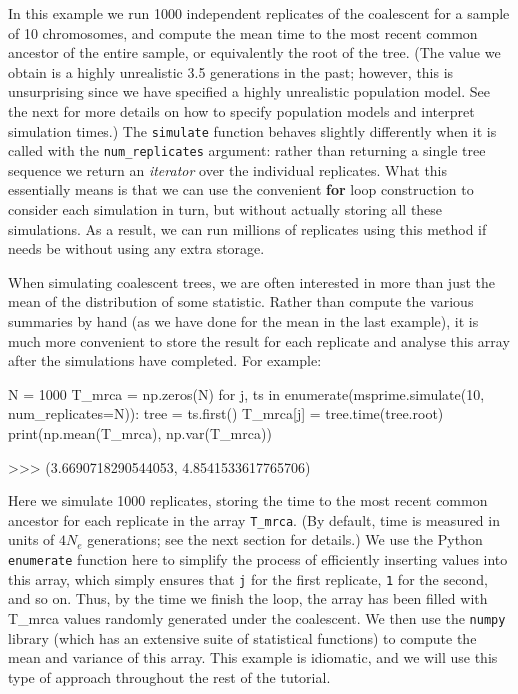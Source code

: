 \documentclass[graybox]{svmult}
\begin{document}
    In this example we run 1000 independent replicates of the coalescent for
a sample of 10 chromosomes, and compute the mean time to the most recent
common ancestor of the entire sample, or equivalently the root of the
tree. (The value we obtain is a highly unrealistic 3.5 generations in
the past; however, this is unsurprising since we have specified a highly
unrealistic population model. See the next for more details on how to
specify population models and interpret simulation times.) The
\texttt{simulate} function behaves slightly differently when it is
called with the \texttt{num\_replicates} argument: rather than returning
a single tree sequence we return an \emph{iterator} over the individual
replicates. What this essentially means is that we can use the
convenient \textbf{for} loop construction to consider each simulation in
turn, but without actually storing all these simulations. As a result,
we can run millions of replicates using this method if needs be without
using any extra storage.

When simulating coalescent trees, we are often interested in more than
just the mean of the distribution of some statistic. Rather than compute
the various summaries by hand (as we have done for the mean in the last
example), it is much more convenient to store the result for each
replicate and analyse this array after the simulations have completed.
For example:

\begin{pythoncode}
N = 1000
T_mrca = np.zeros(N)
for j, ts in enumerate(msprime.simulate(10, num_replicates=N)):
    tree = ts.first()
    T_mrca[j] = tree.time(tree.root)
print(np.mean(T_mrca), np.var(T_mrca))

>>> (3.6690718290544053, 4.8541533617765706)
\end{pythoncode}

    Here we simulate 1000 replicates, storing the time to the most recent
common ancestor for each replicate in the array \texttt{T\_mrca}. (By
default, time is measured in units of \(4 N_e\) generations; see the
next section for details.) We use the Python \texttt{enumerate} function
here to simplify the process of efficiently inserting values into this
array, which simply ensures that \texttt{j} for the first replicate,
\texttt{1} for the second, and so on. Thus, by the time we finish the
loop, the array has been filled with T\_mrca values randomly generated
under the coalescent. We then use the \texttt{numpy} library (which has
an extensive suite of statistical functions) to compute the mean and
variance of this array. This example is idiomatic, and we will use this
type of approach throughout the rest of the tutorial.
\end{document}

